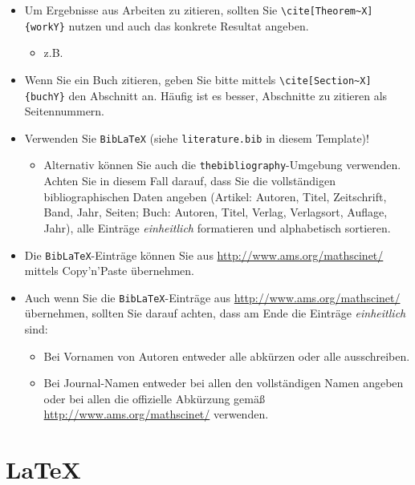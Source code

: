 \begin{itemize}
  \item Um Ergebnisse aus Arbeiten zu zitieren, sollten Sie \verb$\cite[Theorem~X]{workY}$ nutzen und auch das konkrete Resultat angeben.
        \begin{itemize}
          \item z.B.\ \cite[Theorem~4]{MR3457440}
        \end{itemize}

  \item Wenn Sie ein Buch zitieren, geben Sie bitte mittels \verb$\cite[Section~X]{buchY}$
        den Abschnitt an. Häufig ist es besser, Abschnitte zu zitieren als Seitennummern.

  \item Verwenden Sie \verb$BibLaTeX$ (siehe \verb$literature.bib$ in diesem Template)!
        \begin{itemize}
          \item Alternativ können Sie auch die \verb$thebibliography$-Umgebung verwenden. Achten Sie in diesem Fall darauf, dass Sie die vollständigen bibliographischen Daten angeben (Artikel: Autoren, Titel, Zeitschrift, Band, Jahr, Seiten; Buch: Autoren, Titel, Verlag, Verlagsort, Auflage, Jahr), alle Einträge \emph{einheitlich} formatieren und alphabetisch sortieren.
        \end{itemize}

  \item Die \verb$BibLaTeX$-Einträge können Sie aus \url{http://www.ams.org/mathscinet/} mittels Copy'n'Paste überneh\-men.
  \item Auch wenn Sie die \verb$BibLaTeX$-Einträge aus \url{http://www.ams.org/mathscinet/} über\-neh\-men, sollten Sie darauf achten, dass am Ende die Einträge \emph{einheitlich} sind:
        \begin{itemize}
          \item Bei Vornamen von Autoren entweder alle abkürzen oder alle ausschreiben.
          \item Bei Journal-Namen entweder bei allen den vollständigen Namen angeben oder
                bei allen die offizielle Abkürzung gemäß \url{http://www.ams.org/mathscinet/} verwenden.
        \end{itemize}

\end{itemize}

\section{\LaTeX}

